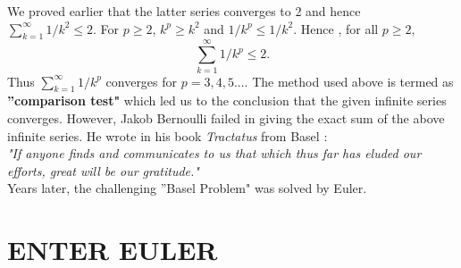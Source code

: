 \documentclass[a4paper,reqno,11pt]{amsart}
\theoremstyle{plain}%
\begin{document}
We proved earlier that the latter series converges to 2 and hence\\
$\sum_{k=1}^{\infty}1/k^2 \leq 2.$ For $p \geq 2$, $k^p \geq k^2$ and $1/k^p \leq 1/k^2.$ Hence , for all $p \geq 2,$\\
$$\sum_{k=1}^{\infty}1/k^p \leq 2.$$
Thus $\sum_{k=1}^{\infty}1/k^p$ converges for $p=3,4,5....$
The method used above is termed as \textbf{''comparison test"} which led us to the conclusion that the given infinite series converges.
However, Jakob Bernoulli failed in giving the exact sum of the above infinite series. He wrote in his book \textit{Tractatus} from Basel :\\
\indent \textit{"If anyone finds and communicates to us that which thus far has eluded our efforts, great will be our gratitude."}\\
Years later, the challenging ''Basel Problem" was solved by Euler.\\
\section*{ENTER EULER}
\end{document}
